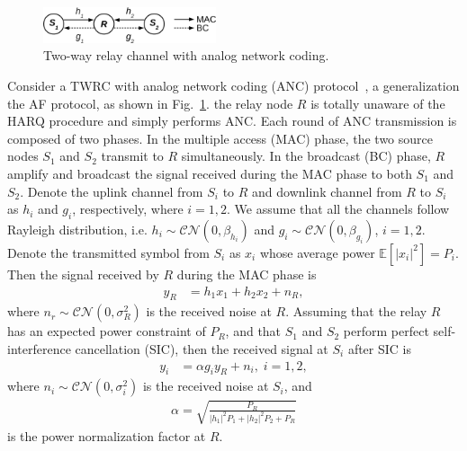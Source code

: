 \documentclass{article}
\begin{document}
\begin{figure}[!t]
  \centering
  \includegraphics[width=2.0in]{./figs/model.eps}
  \caption{Two-way relay channel with analog network coding.}
  \label{fig:model}
\end{figure}

Consider a TWRC with analog network coding (ANC) protocol~\cite{choi2013energy}, 
a generalization the AF protocol, as shown in Fig.~\ref{fig:model}. the relay
node $R$ is totally unaware of the HARQ procedure and simply performs ANC. Each round of ANC
transmission is composed of two phases. In the multiple access (MAC) phase, the
two source nodes $S_1$ and $S_2$ transmit to $R$ simultaneously. In the
broadcast (BC) phase, $R$ amplify and broadcast the signal received during the
MAC phase to both $S_1$ and $S_2$.
Denote the uplink channel from $S_i$ to $R$ and downlink channel from $R$ to
$S_i$ as $h_i$ and $g_i$, respectively, where $i=1,2$. We assume that all
the channels follow Rayleigh distribution, i.e.
$h_i\sim\mathcal{CN}(0,\beta_{h_i})$ and $g_i\sim\mathcal{CN}(0,\beta_{g_i})$,
$i=1,2$. Denote the transmitted symbol from $S_i$ as $x_i$ whose average power
$\mathbb{E}[|x_i|^2]=P_i$. Then the signal received by $R$ during the MAC phase
is
\begin{align}
  y_R & = h_1x_1+h_2x_2+n_R,
  \label{eq:y_R}
\end{align}
where $n_r\sim\mathcal{CN}(0,\sigma_R^2)$ is the received noise at $R$. Assuming
that the relay $R$ has an expected power constraint of $P_R$, and that
$S_1$ and $S_2$ perform perfect self-interference cancellation (SIC), then the
received signal at $S_i$ after SIC is
\begin{align}
  y_i &= \alpha g_i y_R + n_i,\;i=1,2,
  \label{eq:y_i}
\end{align}
where $n_i\sim\mathcal{CN}(0,\sigma_i^2)$ is the received noise at $S_i$, and
\begin{align}
  \alpha = \sqrt{\frac{P_R}{|h_1|^2P_1 + |h_2|^2P_2+P_R}}
\end{align}
is the power normalization factor at $R$.
\end{document}
